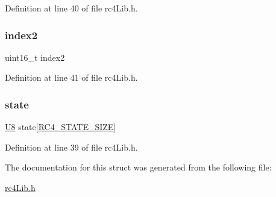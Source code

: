 Definition at line 40 of file rc4\+Lib.\+h.

\mbox{\label{structrc4ctx__t_ae5fd30b17cbf40407158aa026b0caaf7}} 
\subsubsection{\texorpdfstring{index2}{index2}}
{\footnotesize\ttfamily uint16\+\_\+t index2}



Definition at line 41 of file rc4\+Lib.\+h.

\mbox{\label{structrc4ctx__t_ae94ca6cdd84cf2335fa9cf7680e9154b}} 
\subsubsection{\texorpdfstring{state}{state}}
{\footnotesize\ttfamily \hyperlink{rc4_lib_8h_a3cb25ca6f51f003950f9625ff05536fc}{U8} state\mbox{[}\hyperlink{rc4_lib_8h_a50a27b8e7008b8ae28f34a5e082905ef}{R\+C4\+\_\+\+S\+T\+A\+T\+E\+\_\+\+S\+I\+ZE}\mbox{]}}



Definition at line 39 of file rc4\+Lib.\+h.



The documentation for this struct was generated from the following file\+:\begin{DoxyCompactItemize}
\item 
\hyperlink{rc4_lib_8h}{rc4\+Lib.\+h}\end{DoxyCompactItemize}
